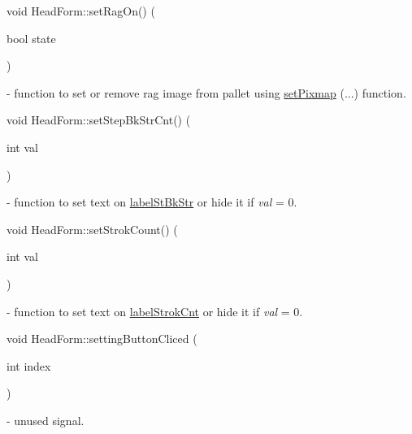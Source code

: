 \mbox{\label{classHeadForm_aaa15b61ff5f3bdbf8c3e7a329fb6b0cb}} 
{\footnotesize\ttfamily void Head\+Form\+::\texorpdfstring{set\+Rag\+On()}{setRagOn} (\begin{DoxyParamCaption}\item[{bool}]{state }\end{DoxyParamCaption})} - function to set or remove rag image from pallet using \hyperlink{classHeadForm_a934e12ca808cb22f74734df9852e7146}{set\+Pixmap} (...) function.

\mbox{\label{classHeadForm_a6b5082ea42b171300a105d6a35d52c91}} 
{\footnotesize\ttfamily void Head\+Form\+::\texorpdfstring{set\+Step\+Bk\+Str\+Cnt()}{setStepBkStrCnt} (\begin{DoxyParamCaption}\item[{int}]{val }\end{DoxyParamCaption})} - function to set text on \hyperlink{classHeadForm_a1a7f706cff05b5644d3eae9ab21b2caf}{label\+St\+Bk\+Str} or hide it if \textit{val} = 0.

\mbox{\label{classHeadForm_a8e86ad0f2d29ec594c62dbfd253b5fee}} 
{\footnotesize\ttfamily void Head\+Form\+::\texorpdfstring{set\+Strok\+Count()}{setStrokCount} (\begin{DoxyParamCaption}\item[{int}]{val }\end{DoxyParamCaption})} - function to set text on \hyperlink{classHeadForm_a591efe6e830fd170cb549bca142d2759}{label\+Strok\+Cnt} or hide it if \textit{val} = 0.

\mbox{\label{classHeadForm_ad5033138e38409217e1ae343c71afc64}} 
{\footnotesize\ttfamily void Head\+Form\+::\texorpdfstring{setting\+Button\+Cliced}{settingButtonCliced} (\begin{DoxyParamCaption}\item[{int}]{index }\end{DoxyParamCaption}){\ttfamily [signal]}} - unused signal.



